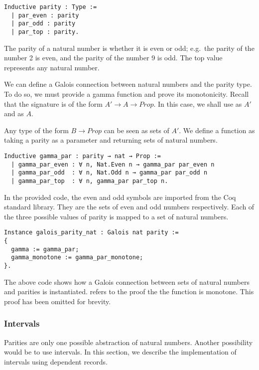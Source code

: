 \begin{listing}
\begin{verbatim}
Inductive parity : Type :=
  | par_even : parity
  | par_odd : parity
  | par_top : parity.
\end{verbatim}
\end{listing}

The parity of a natural number is whether it is even or odd; e.g.\ the parity
of the number 2 is even, and the parity of the number 9 is odd. The top value
represents any natural number.

We can define a Galois connection between natural numbers and the parity type.
To do so, we must provide a gamma function and prove its monotonicity. Recall
that the signature is of the form $A' \rightarrow A \rightarrow Prop$. In this
case, we shall use  as $A'$ and  as $A$.

Any type of the form $B \rightarrow Prop$ can be seen as sets of $A'$. We define
a function  as taking a parity as a parameter and returning
sets of natural numbers.

\begin{listing}
\begin{verbatim}
Inductive gamma_par : parity → nat → Prop :=
  | gamma_par_even : ∀ n, Nat.Even n → gamma_par par_even n
  | gamma_par_odd  : ∀ n, Nat.Odd n → gamma_par par_odd n
  | gamma_par_top  : ∀ n, gamma_par par_top n.
\end{verbatim}
\end{listing}

In the provided code, the even and odd symbols are imported from the Coq
standard library. They are the sets of even and odd numbers respectively. Each
of the three possible values of parity is mapped to a set of natural numbers.

\begin{listing}
\begin{verbatim}
Instance galois_parity_nat : Galois nat parity :=
{
  gamma := gamma_par;
  gamma_monotone := gamma_par_monotone;
}.
\end{verbatim}
\end{listing}

The above code shows how a Galois connection between sets of natural numbers 
and parities is instantiated.  refers to the proof the
the  function is monotone. This proof has been omitted for 
brevity.

\subsubsection{Intervals}
Parities are only one possible abstraction of natural numbers. Another
possibility would be to use intervals. In this section, we describe the
implementation of intervals using dependent records.

